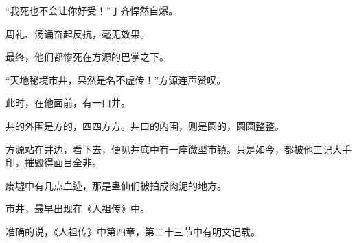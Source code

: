 \begin{this_body}
“我死也不会让你好受！”丁齐悍然自爆。

周礼、汤诵奋起反抗，毫无效果。

最终，他们都惨死在方源的巴掌之下。

“天地秘境市井，果然是名不虚传！”方源连声赞叹。

此时，在他面前，有一口井。

井的外围是方的，四四方方。井口的内围，则是圆的，圆圆整整。

方源站在井边，看下去，便见井底中有一座微型市镇。只是如今，都被他三记大手印，摧毁得面目全非。

废墟中有几点血迹，那是蛊仙们被拍成肉泥的地方。

市井，最早出现在《人祖传》中。

准确的说，《人祖传》中第四章，第二十三节中有明文记载。

\end{this_body}

